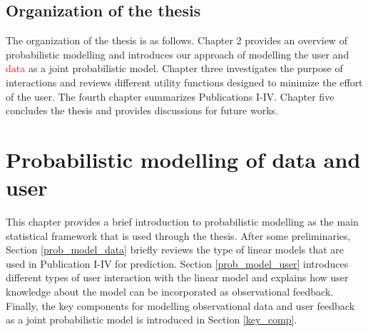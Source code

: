 \documentclass[dissertation,math,vertlayout,pdfa,colorlinks]{aaltoseries}
\begin{document}
\section{Organization of the thesis}

The organization of the thesis is as follows. Chapter 2 provides an overview of probabilistic modelling and introduces our approach of modelling the user and \textcolor{red}{data} as a joint probabilistic model. Chapter three investigates the purpose of interactions and reviews different utility functions designed to minimize the effort of the user. The fourth chapter summarizes Publications I-IV. Chapter five concludes the thesis and provides discussions for future works.



\chapter{Probabilistic modelling of data and user} \label{prob_model_data_user}


This chapter provides a brief introduction to probabilistic modelling as the main statistical framework that is used through the thesis. After some preliminaries,  Section \ref{prob_model_data} briefly reviews the type of linear models that are used in Publication I-IV for prediction. %
Section \ref{prob_model_user} introduces different types of user interaction with the linear model and explains how user knowledge about the model can be incorporated as observational feedback. Finally, the key components for modelling observational data and user feedback as a joint probabilistic model is introduced in Section \ref{key_comp}.
\end{document}
